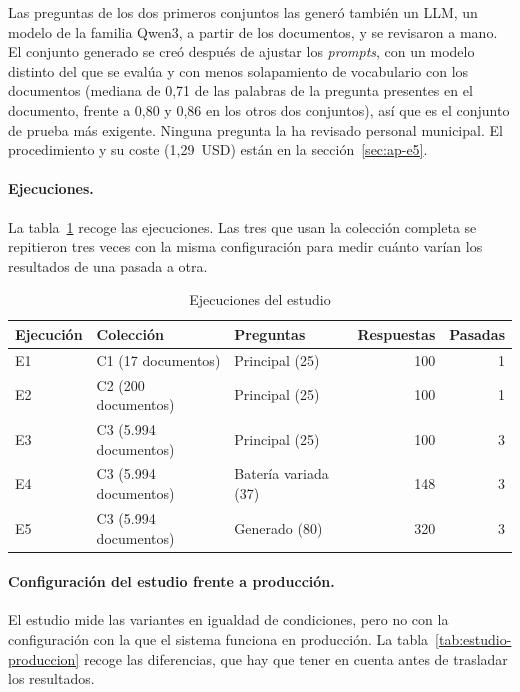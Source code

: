 Las preguntas de los dos primeros conjuntos las generó también un LLM, un modelo de la familia Qwen3, a partir de los documentos, y se revisaron a mano. El conjunto generado se creó después de ajustar los \emph{prompts}, con un modelo distinto del que se evalúa y con menos solapamiento de vocabulario con los documentos (mediana de 0,71 de las palabras de la pregunta presentes en el documento, frente a 0,80 y 0,86 en los otros dos conjuntos), así que es el conjunto de prueba más exigente. Ninguna pregunta la ha revisado personal municipal. El procedimiento y su coste (1,29~USD) están en la sección~\ref{sec:ap-e5}.

\paragraph{Ejecuciones.} La tabla~\ref{tab:ejecuciones} recoge las ejecuciones. Las tres que usan la colección completa se repitieron tres veces con la misma configuración para medir cuánto varían los resultados de una pasada a otra.

\begin{table}[htbp]
\centering\small
\caption{Ejecuciones del estudio}
\label{tab:ejecuciones}
\begin{tabular}{@{}l l l r r@{}}
\toprule
\textbf{Ejecución} & \textbf{Colección} & \textbf{Preguntas} & \textbf{Respuestas} & \textbf{Pasadas} \\
\midrule
E1 & C1 (17 documentos) & Principal (25) & 100 & 1 \\
E2 & C2 (200 documentos) & Principal (25) & 100 & 1 \\
E3 & C3 (5.994 documentos) & Principal (25) & 100 & 3 \\
E4 & C3 (5.994 documentos) & Batería variada (37) & 148 & 3 \\
E5 & C3 (5.994 documentos) & Generado (80) & 320 & 3 \\
\bottomrule
\end{tabular}
\end{table}

\paragraph{Configuración del estudio frente a producción.} El estudio mide las variantes en igualdad de condiciones, pero no con la configuración con la que el sistema funciona en producción. La tabla~\ref{tab:estudio-produccion} recoge las diferencias, que hay que tener en cuenta antes de trasladar los resultados.

